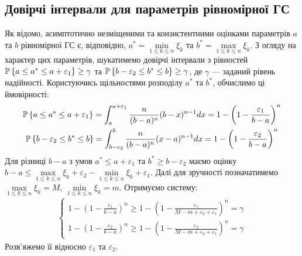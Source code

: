 \subsection{Довірчі інтервали для параметрів рівномірної ГС}
Як відомо,  асимптотично незміщеними та конзистентними оцінками параметрів $a$ та $b$ рівномірної ГС є, відповідно,
$a^* = \underset{1\leq k \leq n}{\min}\xi_k$ та $b^* = \underset{1\leq k \leq n}{\max}\xi_k$. З огляду на характер цих параметрів,
шукатимемо довірчі інтервали з рівностей
$\P\left\{a\leq a^* \leq a+\varepsilon_1 \right\} \geq \gamma$ та $\P\left\{b-\varepsilon_2\leq b^* \leq b\right\} \geq \gamma$,
де $\gamma$ --- заданий рівень надійності.
Користуючись щільностями розподілу $a^*$ та $b^*$, обчислимо ці ймовірності:
\begin{gather*}
    \P\left\{a\leq a^* \leq a+\varepsilon_1 \right\} = \int_{a}^{a+\varepsilon_1} \frac{n}{(b-a)^n} (b-x)^{n-1} dx = 1 - \left(1 - \frac{\varepsilon_1}{b-a}\right)^n \\
    \P\left\{b-\varepsilon_2\leq b^* \leq b\right\} = \int_{b-\varepsilon_2}^b \frac{n}{(b-a)^n} (x-a)^{n-1} dx = 1 - \left(1 - \frac{\varepsilon_2}{b-a}\right)^n
\end{gather*}
Для різниці $b-a$ з умов $a^* \leq a+\varepsilon_1$ та $b^* \geq b-\varepsilon_2$ маємо оцінку
$b-a \leq \underset{1\leq k \leq n}{\max}\xi_k + \varepsilon_2 - \underset{1\leq k \leq n}{\min}\xi_k + \varepsilon_1$.
Далі для зручності позначатимемо $\underset{1\leq k \leq n}{\max}\xi_k = M$, $\underset{1\leq k \leq n}{\min}\xi_k = m$.
Отримуємо систему:
\begin{gather*}
    \begin{cases}
        1 - \left(1 - \frac{\varepsilon_1}{b-a}\right)^n \geq 1 - \left(1 - \frac{\varepsilon_1}{M - m + \varepsilon_2 + \varepsilon_1}\right)^n = \gamma \\
        1 - \left(1 - \frac{\varepsilon_2}{b-a}\right)^n \geq 1 - \left(1 - \frac{\varepsilon_2}{M - m + \varepsilon_2 + \varepsilon_1}\right)^n = \gamma
    \end{cases}
\end{gather*}
Розв'яжемо її відносно $\varepsilon_1$ та $\varepsilon_2$.
